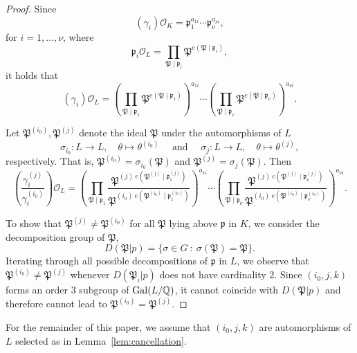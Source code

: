 \begin{proof}
Since 
\[(\gamma_i)\mathcal{O}_K = \mathfrak{p}_1^{a_{1i}} \cdots \mathfrak{p}_{\nu}^{a_{\nu i}},\]
for $i = 1, \dots, \nu$, where
\[\mathfrak{p}_i\mathcal{O}_L=\prod_{\mathfrak{P}\mid\mathfrak{p}_i} \mathfrak{P}^{e(\mathfrak{P}\mid\mathfrak{p}_i)},\]
it holds that
\[(\gamma_i)\mathcal{O}_L = \left(\prod_{\mathfrak{P}\mid\mathfrak{p}_1} \mathfrak{P}^{e(\mathfrak{P}\mid\mathfrak{p}_1)}\right)^{a_{1i}} \cdots \left(\prod_{\mathfrak{P}\mid\mathfrak{p}_{\nu}} \mathfrak{P}^{e(\mathfrak{P}\mid\mathfrak{p}_{\nu})}\right)^{a_{\nu i}}.\]

Let $\mathfrak{P}^{(i_0)},\mathfrak{P}^{(j)}$ denote the ideal $\mathfrak{P}$ under the automorphisms of $L$
\[\sigma_{i_0}: L \to L, \quad \theta \mapsto \theta^{(i_0)} \quad \text{ and } \quad \sigma_{j}: L \to L, \quad \theta \mapsto \theta^{(j)},\]
respectively. That is, $\mathfrak{P}^{(i_0)} = \sigma_{i_0}(\mathfrak{P})$ and $\mathfrak{P}^{(j)} = \sigma_{j}(\mathfrak{P})$. Then
\[\left( \frac{\gamma_i^{(j)}}{\gamma_i^{(i_0)}}\right)\mathcal{O}_L 
	 = \left(\prod_{\mathfrak{P}\mid\mathfrak{p}_1} \frac{\mathfrak{P}^{(j) \ e(\mathfrak{P}^{(j)}\mid\mathfrak{p}_1^{(j)})}}{\mathfrak{P}^{(i_0) \ e(\mathfrak{P}^{(i_0)}\mid\mathfrak{p}^{(i_0)}_1)}}\right)^{a_{1i}} \cdots \left(\prod_{\mathfrak{P}\mid\mathfrak{p}_{\nu}} \frac{\mathfrak{P}^{(j) \ e(\mathfrak{P}^{(j)}\mid\mathfrak{p}^{(j)}_{\nu})}}{\mathfrak{P}^{(i_0) \ e(\mathfrak{P}^{(i_0)}\mid\mathfrak{p}^{(i_0)}_{\nu})}}\right)^{a_{\nu i}}.\]

To show that $\mathfrak{P}^{(j)} \neq \mathfrak{P}^{(i_0)}$ for all $\mathfrak{P}$ lying above $\mathfrak{p}$ in $K$, we consider the decomposition group of $\mathfrak{P}$, 
\[D(\mathfrak{P}|p) = \{\sigma \in G \ : \ \sigma(\mathfrak{P}) = \mathfrak{P}\}.\]
Iterating through all possible decompositions of $\mathfrak{p}$ in $L$, we observe that $\mathfrak{P}^{(i_0)} \neq \mathfrak{P}^{(j)}$ whenever $D(\mathfrak{P}_i|p)$ does not have cardinality $2$. Since $(i_0,j,k)$ forms an order $3$ subgroup of $\operatorname{Gal}(L/\mathbb{Q})$, it cannot coincide with $D(\mathfrak{P}|p)$ and therefore cannot lead to $\mathfrak{P}^{(i_0)} = \mathfrak{P}^{(j)}$. 
\end{proof}

For the remainder of this paper, we assume that $(i_0,j,k)$ are automorphisms of $L$ selected as in Lemma~\ref{lem:cancellation}.

